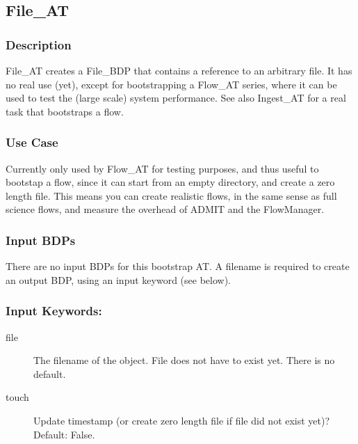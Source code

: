 
\subsection{File\_AT}


\subsubsection{Description}


File\_AT creates a File\_BDP that contains a reference to an arbitrary file. 
It has no real use (yet), except for bootstrapping a Flow\_AT series, 
where it can be used to test the (large scale) system performance.
See also Ingest\_AT for a real task that bootstraps a flow.

\subsubsection{Use Case}


Currently only used by Flow\_AT for testing purposes, and thus useful
to bootstap a flow, since it can start from an empty directory, and
create a zero length file.  This means you can create realistic flows,
in the same sense as full science flows, and measure the overhead
of ADMIT and the FlowManager.

\subsubsection{Input BDPs}

There are no input BDPs for this bootstrap AT. A filename is required to
create an output BDP, using an input keyword (see below).

\subsubsection{Input Keywords:}

\begin{description}

\item[file] The filename of the object. File does not have to exist yet.
  There is no default.

\item[touch]  Update timestamp (or create zero length file 
  if file did not exist yet)? Default: False.

\end{description}

